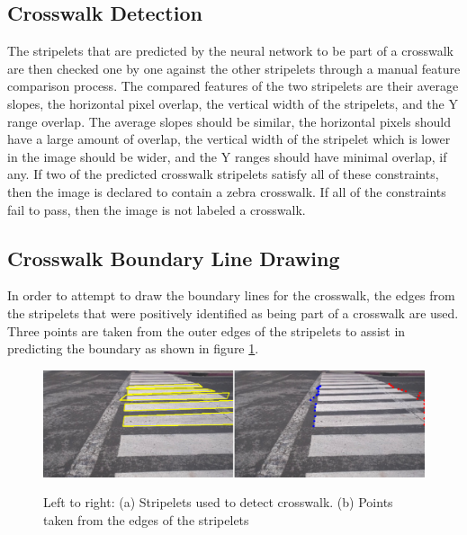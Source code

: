 \documentclass[12pt]{ucthesis}
\newcommand{\captionfonts}{\small\bf\ssp}
\begin{document}
\subsection{Crosswalk Detection}

The stripelets that are predicted by the neural network to be part of a crosswalk are then checked one by one against the other stripelets through a manual feature comparison process. The compared features of the two stripelets are their average slopes, the horizontal pixel overlap, the vertical width of the stripelets, and the Y range overlap. The average slopes should be similar, the horizontal pixels should have a large amount of overlap, the vertical width of the stripelet which is lower in the image should be wider, and the Y ranges should have minimal overlap, if any. If two of the predicted crosswalk stripelets satisfy all of these constraints, then the image is declared to contain a zebra crosswalk. If all of the constraints fail to pass, then the image is not labeled a crosswalk. 

\subsection{Crosswalk Boundary Line Drawing}

In order to attempt to draw the boundary lines for the crosswalk, the edges from the stripelets that were positively identified as being part of a crosswalk are used. Three points are taken from the outer edges of the stripelets to assist in predicting the boundary as shown in figure \ref{fig:LinesAndEdgePoints}.  

\begin{figure}[h!]
\begin{center}
\includegraphics[width=14cm]{LinesAndEdgePoints.png}
\captionfonts
\caption[Crosswalk Detected Stripelets and points along their edges]{Left to right: (a) Stripelets used to detect crosswalk. (b) Points taken from the edges of the stripelets}
\label{fig:LinesAndEdgePoints}
\end{center}
\end{figure}
\end{document}
